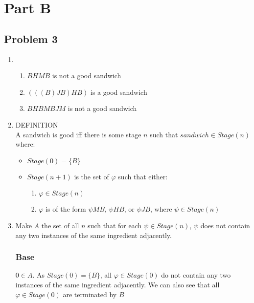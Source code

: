 \documentclass[a4paper]{article}
\newcommand{\SET}[1]{\{ {#1} \}}
\begin{document}
\section*{Part B}

\subsection*{Problem 3}

\begin{enumerate}
    \item \begin{enumerate}
        \item $BHMB$ is not a good sandwich
        \item $(((B)JB)HB)$ is a good sandwich
        \item $BHBMBJM$ is not a good sandwich
    
    \end{enumerate}

    \item \uppercase{Definition}\\
    A sandwich is good iff there is some stage $n$ such that $sandwich \in Stage(n)$ where:

    \begin{itemize}
        \item $Stage(0) = \{ B \}$
        \item $Stage(n + 1)$ is the set of $\varphi$ such that either:
        \begin{enumerate}
            \item $\varphi \in Stage(n)$
            \item $\varphi$ is of the form $\psi MB$, $\psi HB$, or $\psi JB$, where $\psi \in Stage(n)$
        \end{enumerate}
    \end{itemize}

    \item Make $A$ the set of all $n$ such that for each $\psi \in Stage(n)$, $\psi$ does not contain any two instances of the same ingredient adjacently.

    \subsubsection*{Base} $0 \in A$. As $Stage(0) = \SET{B}$, all $\varphi \in Stage(0)$ do not contain any two instances of the same ingredient adjacently. We can also see that all $\varphi \in Stage(0)$ are terminated by $B$



\end{enumerate}
\end{document}
